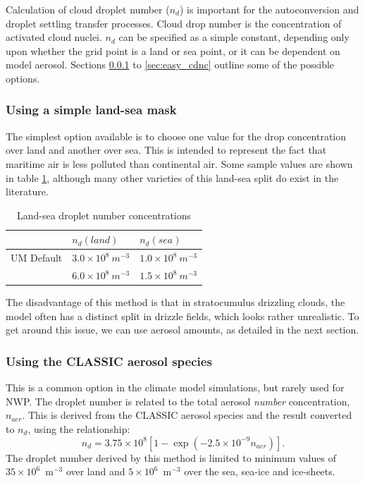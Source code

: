 \documentclass{UMDP_article}
\def\bq{\begin{equation}}
\def\eq{\end{equation}}
\begin{document}
Calculation of cloud droplet number ($n_d$) is important for the autoconversion and
droplet settling transfer processes. Cloud drop number is 
the concentration of activated 
cloud nuclei. $n_d$ can be specified as a simple constant, 
depending only upon whether the grid point is a land or sea point, 
or it can be dependent on model aerosol. Sections \ref{sec:landsea} to 
\ref{sec:easy_cdnc} outline some of the possible options.

\subsubsection{Using a simple land-sea mask}
\label{sec:landsea}
The simplest option available is to choose one value for the drop concentration
over land and another over sea. This is intended to represent the fact that 
maritime air is less polluted than continental air.
Some sample values are shown in table \ref{tab:drop_num}, although many other
varieties of this land-sea split do exist in the literature.
%
\begin{table}[ht!]
\begin{center}
\begin{tabular}{lll}
\hline
           & $n_d(land)$                 & $n_d(sea)$               \\  \hline
UM Default & $3.0 \times 10^8~m^{-3}$    & $1.0 \times 10^8~m^{-3}$  \\  
\cite{Bower:Choularton:1992} & $6.0 \times 10^8~m^{-3}$  & $1.5 \times 10^8~m^{-3}$ 
\\ \hline
\end{tabular}
\end{center}
\caption{Land-sea droplet number concentrations}
\label{tab:drop_num}
\end{table}
%
The disadvantage of this method is that in stratocumulus drizzling clouds, the
model often has a distinct split in drizzle fields, which looks rather unrealistic.
To get around this issue, we can use aerosol amounts, as detailed in the next
section.

\subsubsection{Using the CLASSIC aerosol species}
\label{sec:CLASSIC}
This is a common option in the climate model simulations, but rarely used for NWP. 
The droplet number is related to the total aerosol \textit{number} concentration,
$n_{aer}$. This is derived from the CLASSIC aerosol species \citep{Bellouin:etal:2007}
and the result converted to $n_{d}$, using the \cite{Jones:etal:1994} relationship:
\bq
\label{eq:Jones_Nature}
n_{d} = 3.75 \times 10^8 \left[ 1 - \exp 
\left( -2.5 \times 10^{-9} n_{aer} \right) \right].
\eq
The droplet number derived by this method is limited to minimum values of $35 
\times 10^6$~m$^{-3}$ over land and $5 \times 10^6$~m$^{-3}$ over the sea, sea-ice 
and ice-sheets.
\end{document}
